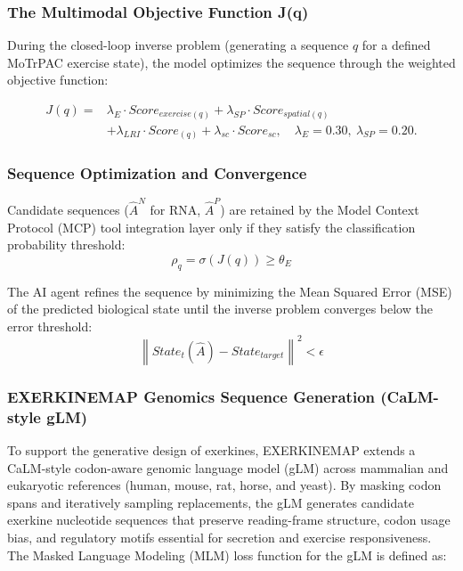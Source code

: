\documentclass[11pt]{article}
\begin{document}
\subsubsection{The Multimodal Objective Function J(q)}
During the closed-loop inverse problem (generating a sequence $q$ for a defined MoTrPAC exercise state), the model optimizes the sequence through the weighted objective function: 

\begin{equation}\label{eq:J}
\begin{split}
J(q) ={}& \lambda_E \cdot Score_{exercise(q)} + \lambda_{SP} \cdot Score_{spatial(q)} \\
&+ \lambda_{LRI} \cdot Score_{(q)} + \lambda_{sc} \cdot Score_{sc}, \quad \lambda_E = 0.30,\ \lambda_{SP} = 0.20.
\end{split}
\end{equation}

\subsubsection{Sequence Optimization and Convergence}
Candidate sequences ($\hat{A}^N$ for RNA, $\hat{A}^P$) are retained by the Model Context Protocol (MCP) tool integration layer only if they satisfy the classification probability threshold: 
\begin{equation}
\rho_q=\sigma(J(q)) \geq \theta_E
\end{equation}

The AI agent refines the sequence by minimizing the Mean Squared Error (MSE) of the predicted biological state until the inverse problem converges below the error threshold: 
\begin{equation}
\left\|State_t(\hat{A}) - State_{target}\right\|^2 < \epsilon
\end{equation}

\subsubsection{EXERKINEMAP Genomics Sequence Generation (CaLM-style gLM)}
To support the generative design of exerkines, EXERKINEMAP extends a CaLM-style codon-aware genomic language model (gLM) across mammalian and eukaryotic references (human, mouse, rat, horse, and yeast). By masking codon spans and iteratively sampling replacements, the gLM generates candidate exerkine nucleotide sequences that preserve reading-frame structure, codon usage bias, and regulatory motifs essential for secretion and exercise responsiveness. The Masked Language Modeling (MLM) loss function for the gLM is defined as: 
\end{document}
